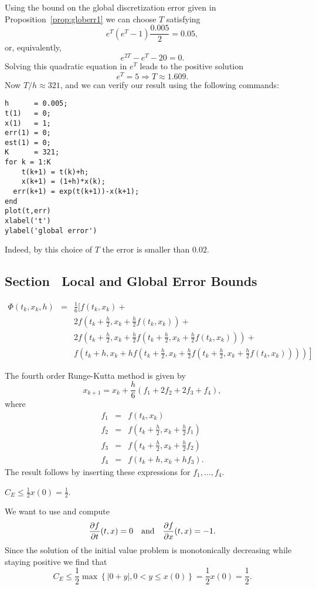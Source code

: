 \documentclass{ximera}
\begin{document}
\soln Using the bound on the global discretization error
given in Proposition~\ref{prop:globerr1} we can choose
$T$ satisfying
\[
e^{T}(e^{T}-1)\frac{0.005}{2} = 0.05,
\]
or, equivalently,
\[
e^{2T} - e^T - 20 = 0.
\]
Solving this quadratic equation in $e^T$ leads to the positive
solution
\[
e^T = 5 \Rightarrow T \approx 1.609.
\]
Now $T/h \approx 321$, and we can verify our result using the
following \Matlab commands:
\begin{verbatim}
h      = 0.005;
t(1)   = 0;
x(1)   = 1;
err(1) = 0;
est(1) = 0;
K      = 321;
for k = 1:K
    t(k+1) = t(k)+h;
    x(k+1) = (1+h)*x(k);
  err(k+1) = exp(t(k+1))-x(k+1);
end
plot(t,err)
xlabel('t')
ylabel('global error')
\end{verbatim}
Indeed, by this choice of $T$ the error is smaller than $0.02$.



\subsection*{Section~\protect{\ref{sec:LGEE}} Local and Global Error Bounds}

 \ans
\begin{eqnarray*}
\Phi(t_k,x_k,h) & = & \frac{1}{6}\Big[f(t_k,x_k)+\\
&&2f\left(t_k+\frac{h}{2},x_k+\frac{h}{2}f(t_k,x_k)\right) +\\
&&2f\left(t_k+\frac{h}{2},x_k+
  \frac{h}{2}f\left(t_k+\frac{h}{2},x_k+\frac{h}{2}f(t_k,x_k)\right)\right)+\\
&&\left.f\left(t_k+h,x_k+hf\left(t_k+\frac{h}{2},x_k+
  \frac{h}{2}f\left(t_k+\frac{h}{2},x_k+
  \frac{h}{2}f(t_k,x_k)\right)\right)\right)\right]
\end{eqnarray*}

\soln The fourth order Runge-Kutta method is given by
\[
x_{k+1} = x_k+\frac{h}{6}(f_1+2f_2+2f_3+f_4),
\]
where
\begin{eqnarray*}
f_1 &=& f(t_k,x_k)\\
f_2 &=& f\left(t_k+\frac{h}{2},x_k+\frac{h}{2}f_1\right)\\
f_3 &=& f\left(t_k+\frac{h}{2},x_k+\frac{h}{2}f_2\right)\\
f_4 &=& f(t_k+h,x_k+hf_3).
\end{eqnarray*}
The result follows by inserting these expressions for $f_1,\ldots,f_4$.

\newpage
{} \ans $C_E \le \frac{1}{2}x(0)=\frac{1}{2}$.

\soln We want to use  and compute
\[
\frac{\partial f}{\partial t}(t,x)=0\quad\mbox{and}\quad
\frac{\partial f}{\partial x}(t,x)=-1.
\]
Since the solution of the initial value problem is monotonically
decreasing while staying positive we find that
\[
C_E\le \frac{1}{2}\max\left\{ \left\vert 0+y\right\vert,
0<y\le x(0) \right\} = \frac{1}{2}x(0)=\frac{1}{2}.
\]
\end{document}
